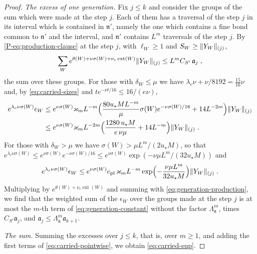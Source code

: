 \begin{proof}
\emph{The excess of one generation.} Fix $j \leq k$ and consider the groups of the sum which were made at the step $j$. Each of them has a traversal of the step $j$ in its interval which is contained in $\mathfrak n'$, namely the one which contains a fine bond common to $\mathfrak n'$ and the interval, and $\mathfrak n'$ contains $L^m$ traversals of the step $j$. By \eqref{P-eq:production-clause} at the step $j$, with $\ell_W \geq 1$ and $S_W \geq \lVert Y_W\rVert_{(j)}$,
\begin{equation}\label{eq:generation-production}
    \sum_We^{\theta(W) + \nu\sigma(W) + \nu_e\operatorname{ext}(W)}\lVert Y_W\rVert_{(j)} \leq L^mC_{S'}\,\mathfrak a_j\;,
\end{equation}
the sum over these groups. For those with $\delta_W \leq \mu$ we have $\lambda_c\nu + \nu/8192 = \frac{15}{16}\nu$ and, by \eqref{eq:carried-sizes} and $te^{-\nu t/16} \leq 16/(e\nu)$,
\begin{align*}
    e^{\lambda_c\nu\sigma(W)}\epsilon_W &\leq e^{\nu\sigma(W)}\varkappa_mL^{-m}\Bigl(\frac{80u_\star ML^{-m}}{\mu}\sigma(W)e^{-\nu\sigma(W)/16} + 14L^{-2m}\Bigr)\lVert Y_W\rVert_{(j)}\\
    &\leq e^{\nu\sigma(W)}\varkappa_mL^{-2m}\Bigl(\frac{1280\,u_\star M}{e\,\nu\mu} + 14L^{-m}\Bigr)\lVert Y_W\rVert_{(j)}\;.
\end{align*}
For those with $\delta_W > \mu$ we have $\sigma(W) > \mu L^m/(2u_\star M)$, so that $e^{\lambda_c\nu\sigma(W)} \leq e^{\nu\sigma(W)}e^{-\nu\sigma(W)/16} \leq e^{\nu\sigma(W)}\exp(-\nu\mu L^m/(32u_\star M))$ and
\[
    e^{\lambda_c\nu\sigma(W)}\epsilon_W \leq e^{\nu\sigma(W)}c_{\mathrm{pl}}\,\varkappa_mL^{-m}\exp\Bigl(-\frac{\nu\mu L^m}{32u_\star M}\Bigr)\lVert Y_W\rVert_{(j)}\;.
\]
Multiplying by $e^{\theta(W) + \nu_e\operatorname{ext}(W)}$ and summing with \eqref{eq:generation-production}, we find that the weighted sum of the $\epsilon_W$ over the groups made at the step $j$ is at most the $m$-th term of \eqref{eq:generation-constant} without the factor $\Lambda_{\mathfrak a}^m$, times $C_{S'}\mathfrak a_j$, and $\mathfrak a_j \leq \Lambda_{\mathfrak a}^m\mathfrak a_{k+1}$.

\emph{The sum.} Summing the excesses over $j \leq k$, that is, over $m \geq 1$, and adding the first terms of \eqref{eq:carried-pointwise}, we obtain \eqref{eq:carried-sup}.
\end{proof}





